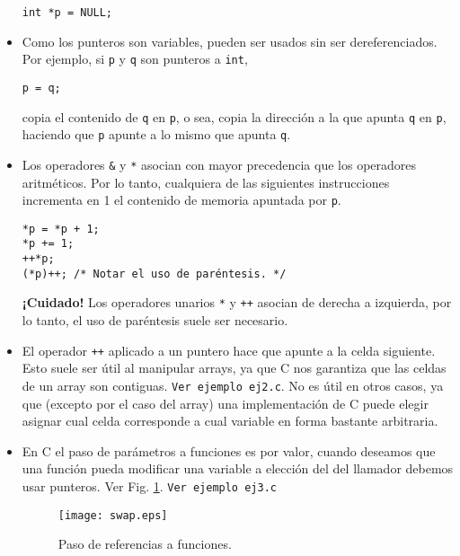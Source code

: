 \documentclass[12pt,a4paper,spanish]{article}
\begin{document}
\begin{itemize}
\begin{verbatim}
int *p = NULL;
\end{verbatim}

\item Como los punteros son variables, pueden ser usados sin ser
dereferenciados. Por ejemplo, si \verb+p+ y \verb+q+ son punteros a
\verb+int+,

\begin{verbatim}
p = q;
\end{verbatim}

copia el contenido de \verb+q+ en \verb+p+, o sea, copia la
dirección a la que apunta \verb+q+ en \verb+p+, haciendo que
\verb+p+ apunte a lo mismo que apunta \verb+q+.

\item Los operadores \verb+&+ y \verb+*+ asocian con mayor precedencia
que los operadores aritméticos. Por lo tanto, cualquiera de las
siguientes instrucciones incrementa en 1 el contenido de memoria
apuntada por \verb+p+.

\begin{verbatim}
*p = *p + 1;
*p += 1;
++*p;
(*p)++; /* Notar el uso de paréntesis. */
\end{verbatim}

\textbf{¡Cuidado!} Los operadores unarios \verb+*+ y \verb-++- asocian
de derecha a izquierda, por lo tanto, el uso de paréntesis suele ser
necesario.

\item El operador \verb-++- aplicado a un puntero hace que apunte a la
celda siguiente. Esto suele ser útil al manipular arrays, ya que C nos garantiza
que las celdas de un array son contiguas. \verb+Ver ejemplo ej2.c+. No es útil
en otros casos, ya que (excepto por el caso del array) una implementación de C
puede elegir asignar cual celda corresponde a cual variable en forma bastante
arbitraria.

\item En \textsf{C} el paso de parámetros a funciones es
por valor, cuando deseamos que una función pueda modificar una variable a 
elección del del llamador debemos usar punteros. Ver Fig. \ref{fig:ref_pass}.
\verb+Ver ejemplo ej3.c+

\begin{figure}[htbp]
\begin{center}
\texttt{[image: swap.eps]}
\caption{Paso de referencias a funciones.}
\label{fig:ref_pass}
\end{center}
\end{figure}

\end{itemize}
\end{document}
